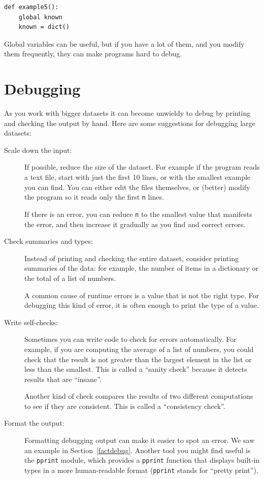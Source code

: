 \documentclass[10pt]{book}
\begin{document}
\begin{verbatim}
def example5():
    global known
    known = dict()
\end{verbatim}
%
Global variables can be useful, but if you have a lot of them,
and you modify them frequently, they can make programs
hard to debug.


\section{Debugging}

As you work with bigger datasets it can become unwieldy to
debug by printing and checking the output by hand.  Here are some
suggestions for debugging large datasets:

\begin{description}

\item[Scale down the input:] If possible, reduce the size of the
dataset.  For example if the program reads a text file, start with
just the first 10 lines, or with the smallest example you can find.
You can either edit the files themselves, or (better) modify the
program so it reads only the first {\tt n} lines.

If there is an error, you can reduce {\tt n} to the smallest
value that manifests the error, and then increase it gradually
as you find and correct errors.

\item[Check summaries and types:] Instead of printing and checking the
entire dataset, consider printing summaries of the data: for example,
the number of items in a dictionary or the total of a list of numbers.

A common cause of runtime errors is a value that is not the right
type.  For debugging this kind of error, it is often enough to print
the type of a value.

\item[Write self-checks:]  Sometimes you can write code to check
for errors automatically.  For example, if you are computing the
average of a list of numbers, you could check that the result is
not greater than the largest element in the list or less than
the smallest.  This is called a ``sanity check'' because it detects
results that are ``insane''.

Another kind of check compares the results of two different
computations to see if they are consistent.  This is called a
``consistency check''.

\item[Format the output:] Formatting debugging output
can make it easier to spot an error.  We saw an example in
Section~\ref{factdebug}.  Another tool you might find useful is the {\tt pprint} module, which provides
a {\tt pprint} function that displays built-in types in
a more human-readable format ({\tt pprint} stands for
``pretty print'').

\end{description}
\end{document}
